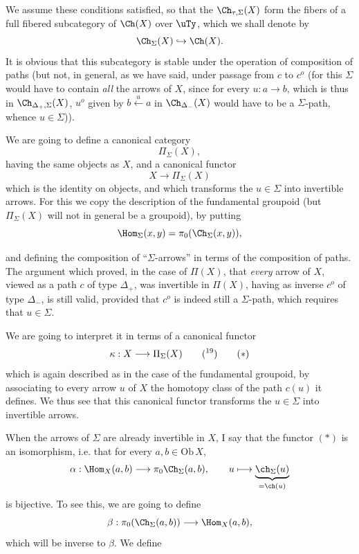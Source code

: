 

We assume these conditions satisfied, so that the $\Ch_{\tau,\Sigma}(X)$ form the fibers of a full fibered subcategory of $\Ch(X)$ over $\uTy$, which we shall denote by
\[
\Ch_{\Sigma}(X) \hookrightarrow \Ch(X).
\]
It is obvious that this subcategory is stable under the operation of composition of paths (but not, in general, as we have said, under passage from $c$ to $c^o$ (for this $\Sigma$ would have to contain \textit{all} the arrows of $X$, since for every $u : a \longrightarrow b$, which is thus in $\Ch_{\Delta_+,\Sigma}(X)$, $u^o$ given by $b \xleftarrow{\ u\ } a$ in $\Ch_{\Delta_-}(X)$ would have to be a $\Sigma$-path, whence $u \in \Sigma$)).

We are going to define a canonical category
\[
\Pi_\Sigma(X),
\]
having the same objects as $X$, and a canonical functor
\[
X \longrightarrow \Pi_\Sigma(X)
\]
which is the identity on objects, and which transforms the $u \in \Sigma$ into invertible arrows. For this we copy the description of the fundamental groupoid (but $\Pi_\Sigma(X)$ will not in general be a groupoid), by putting
\[
\Hom_\Sigma(x,y) = \pi_0(\Ch_\Sigma(x,y)),
\]


and defining the composition of ``$\Sigma$-arrows'' in terms of the composition of paths. The argument which proved, in the case of $\Pi(X)$, that \textit{every} arrow of $X$, viewed as a path $c$ of type $\Delta_+$, was invertible in $\Pi(X)$, having as inverse $c^o$ of type $\Delta_-$, is still valid, provided that $c^o$ is indeed still a $\Sigma$-path, which requires that $u \in \Sigma$.

We are going to interpret it in terms of a canonical functor
\[
\kappa : X \longrightarrow \Pi_\Sigma(X) \qquad \text{(\footnotemark[19])}
\tag*{$(*)$}
\]
which is again described as in the case of the fundamental groupoid, by associating to every arrow $u$ of $X$ the homotopy class of the path $c(u)$ it defines. We thus see that this canonical functor transforms the $u \in \Sigma$ into invertible arrows.

When the arrows of $\Sigma$ are already invertible in $X$, I say that the functor $(*)$ is an isomorphism, i.e. that for every $a, b \in \mathrm{Ob}\,X$,
\[
\alpha : \Hom_X(a,b) \longrightarrow \pi_0\Ch_\Sigma(a,b), \qquad u \longmapsto \underbrace{\ch_\Sigma(u)}_{= \ch(u)}
\]
is bijective. To see this, we are going to define
\[
\beta : \pi_0(\Ch_\Sigma(a,b)) \longrightarrow \Hom_X(a,b),
\]
which will be inverse to $\beta$. We define %


